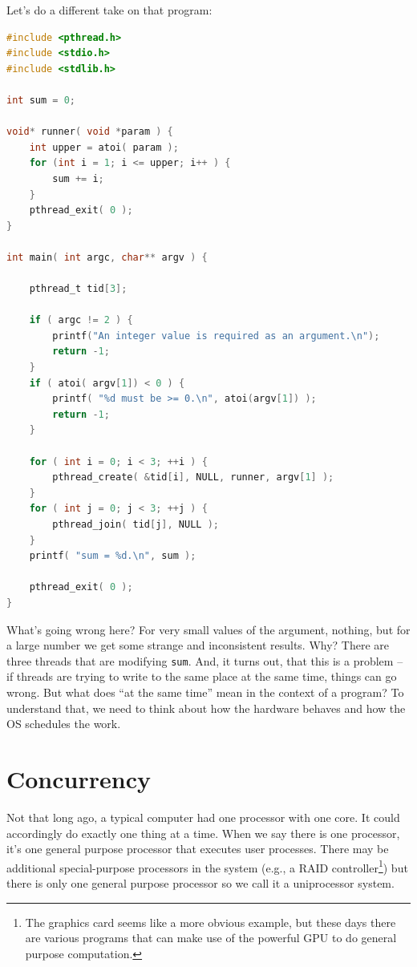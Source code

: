 Let's do a different take on that program:

\begin{lstlisting}[language=C]
#include <pthread.h>
#include <stdio.h>
#include <stdlib.h>

int sum = 0;

void* runner( void *param ) {
    int upper = atoi( param );
    for (int i = 1; i <= upper; i++ ) {
        sum += i;
    }
    pthread_exit( 0 );
}

int main( int argc, char** argv ) {

    pthread_t tid[3];

    if ( argc != 2 ) {
        printf("An integer value is required as an argument.\n");
        return -1;
    }
    if ( atoi( argv[1]) < 0 ) {
        printf( "%d must be >= 0.\n", atoi(argv[1]) );
        return -1;
    }

    for ( int i = 0; i < 3; ++i ) {
        pthread_create( &tid[i], NULL, runner, argv[1] );
    }
    for ( int j = 0; j < 3; ++j ) {
        pthread_join( tid[j], NULL );
    }
    printf( "sum = %d.\n", sum );

    pthread_exit( 0 );
}
\end{lstlisting}

What's going wrong here? For very small values of the argument, nothing, but for a large number we get some strange and inconsistent results. Why? There are three threads that are modifying \texttt{sum}. And, it turns out, that this is a problem -- if threads are trying to write to the same place at the same time, things can go wrong. But what does ``at the same time'' mean in the context of a program? To understand that, we need to think about how the hardware behaves and how the OS schedules the work.

\section*{Concurrency}

Not that long ago, a typical computer had one processor with one core. It could accordingly do exactly one thing at a time. When we say there is one processor, it's one general purpose processor that executes user processes. There may be additional special-purpose processors in the system (e.g., a RAID controller\footnote{The graphics card seems like a more obvious example, but these days there are various programs that can make use of the powerful GPU to do general purpose computation.}) but there is only one general purpose processor so we call it a uniprocessor system.

